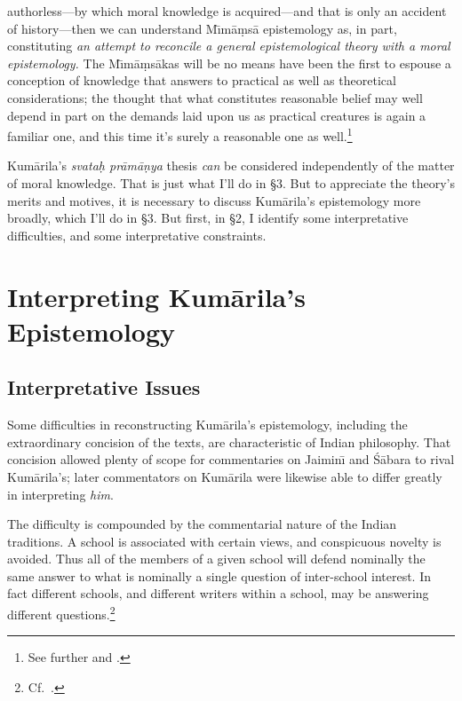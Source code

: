 ﻿\documentclass[11pt]{amsart}
\begin{document}
authorless---by which moral knowledge is acquired---and that is only an accident of history---then we can understand M\={\i}m\=a\d ms\=a epistemology as, in part, constituting \emph{an attempt to reconcile a general epistemological theory with a moral epistemology.} The M\={\i}m\=a\d ms\=akas will be no means have been the first to espouse a conception of knowledge that answers to practical as well as theoretical considerations; the thought that what constitutes reasonable belief may well depend in part on the demands laid upon us as practical creatures is again a familiar one, and this time it's surely a reasonable one as well.\footnote{See further \citet{clooney1987vhn} and \citet{tabereternality}.}

Kum\=arila's \emph{svata\d h pr\=am\=a\d nya} thesis \emph{can} be considered independently of the matter of moral knowledge. That is just what I'll do in \S3. But to appreciate the theory's merits and motives, it is necessary to discuss Kum\=arila's epistemology more broadly, which I'll do in \S3. But first, in \S2, I identify some interpretative difficulties, and some interpretative constraints.



\section{Interpreting Kum\=arila's Epistemology}

\subsection{Interpretative Issues} \label{interpretativeissues}

Some difficulties in reconstructing Kum\=arila's epistemology, including the extraordinary concision of the texts, are characteristic of Indian philosophy. That concision allowed plenty of scope for commentaries on Jaimin\={\i} and \small\'S\normalsize \=abara to rival Kum\=arila's; later commentators on Kum\=arila were likewise able to differ greatly in interpreting \emph{him}.

The difficulty is compounded by the commentarial nature of the Indian traditions. A school is associated with certain views, and conspicuous novelty is avoided. Thus all of the members of a given school will defend nominally the same answer to what is nominally a single question of inter-school interest. In fact different schools, and different writers within a school, may be answering different questions.\footnote{Cf.~\citet[p.~1]{mohanty1989gangesa}.}
\end{document}
